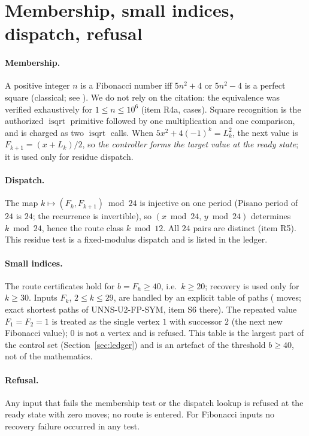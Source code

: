 \documentclass[11pt]{article}
\theoremstyle{definition}
\theoremstyle{remark}
\DeclareMathOperator{\isqrt}{isqrt}
\begin{document}
\section{Membership, small indices, dispatch, refusal}
\paragraph{Membership.} A positive integer $n$ is a Fibonacci number iff $5n^2+4$ or $5n^2-4$ is a perfect square (classical; see \cite{koshy}). We do not rely on the citation: the equivalence was verified exhaustively for $1\le n\le10^6$ (item R4a, \NCrit{} cases). Square recognition is the authorized $\isqrt$ primitive followed by one multiplication and one comparison, and is charged as two $\isqrt$ calls. When $5x^2+4(-1)^k=L_k^2$, the next value is $F_{k+1}=(x+L_k)/2$, so \emph{the controller forms the target value at the ready state}; it is used only for residue dispatch.

\paragraph{Dispatch.} The map $k\mapsto(F_k,F_{k+1})\bmod 24$ is injective on one period (Pisano period of $24$ is $24$; the recurrence is invertible), so $(x\bmod24,\,y\bmod24)$ determines $k\bmod24$, hence the route class $k\bmod 12$. All $24$ pairs are distinct (item R5). This residue test is a fixed-modulus dispatch and is listed in the ledger.

\paragraph{Small indices.} The route certificates hold for $b=F_h\ge40$, i.e.\ $k\ge20$; recovery is used only for $k\ge30$. Inputs $F_k$, $2\le k\le29$, are handled by an explicit table of \FibSmallPaths{} paths (\FibSmallMoves{} moves; exact shortest paths of UNNS-U2-FP-SYM, item S6 there). The repeated value $F_1=F_2=1$ is treated as the single vertex $1$ with successor $2$ (the next new Fibonacci value); $0$ is not a vertex and is refused. This table is the largest part of the control set (Section~\ref{sec:ledger}) and is an artefact of the threshold $b\ge40$, not of the mathematics.

\paragraph{Refusal.} Any input that fails the membership test or the dispatch lookup is refused at the ready state with zero moves; no route is entered. For Fibonacci inputs no recovery failure occurred in any test.
\end{document}
